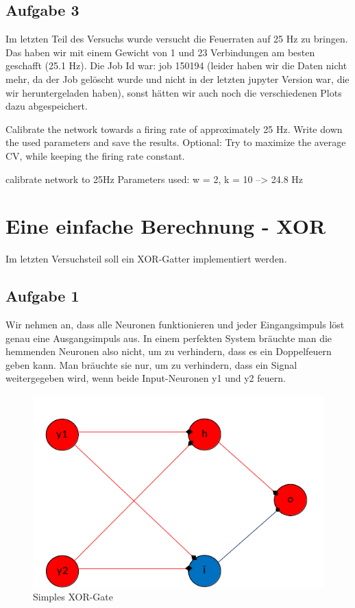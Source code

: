 \documentclass[10pt,a4paper]{scrartcl}
\begin{document}
\subsection{Aufgabe 3}
Im letzten Teil des Versuchs wurde versucht die Feuerraten auf 25 Hz zu bringen. Das haben wir mit einem Gewicht von 1 und 23 Verbindungen am besten geschafft (25.1 Hz). Die Job Id war: job 150194 (leider haben wir die Daten nicht mehr, da der Job gelöscht wurde und nicht in der letzten jupyter Version war, die wir heruntergeladen haben), sonst hätten wir auch noch die verschiedenen Plots dazu abgespeichert. 
 
Calibrate the network towards a firing rate of approximately 25 Hz. Write down the
used parameters and save the results. Optional: Try to maximize the average CV, while
keeping the firing rate constant.

calibrate network to 25Hz
Parameters used:
w = 2, k = 10
--> 24.8 Hz


\newpage


\section{Eine einfache Berechnung - XOR}
Im letzten Versuchsteil soll ein XOR-Gatter implementiert werden.

\subsection{Aufgabe 1}
Wir nehmen an, dass alle Neuronen funktionieren und jeder Eingangsimpuls löst genau eine Ausgangsimpuls aus. In einem perfekten System bräuchte man die hemmenden Neuronen also nicht, um zu verhindern, dass es ein Doppelfeuern geben kann. Man bräuchte sie nur, um zu verhindern, dass ein Signal weitergegeben wird, wenn beide Input-Neuronen y1 und y2 feuern.

\begin{figure} [ht]
\begin{center}
\label{fig:abb4}
\caption{Simples XOR-Gate}
\includegraphics[scale=0.45]{pictures/xor_gatter.png}
\end{center}
\end{figure}
\end{document}
